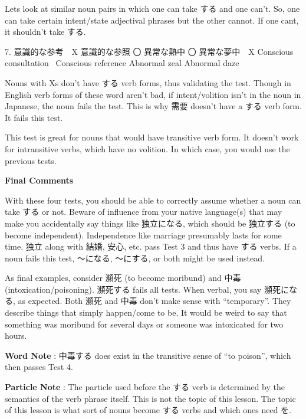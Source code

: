 \par{ Let\textquotesingle s look at similar noun pairs in which one can take する and one can't. So, one can take certain intent\slash state adjectival phrases but the other cannot. If one can\textquotesingle t, it shouldn't take する. }

\par{7. 意識的な参考　X  意識的な参照 〇  異常な熱中 〇  異常な夢中　X \hfill\break
Conscious consultation  Conscious reference  Abnormal zeal  Abnormal daze }

\par{ Nouns with Xs don't have する verb forms, thus validating the test. Though in English verb forms of these word aren't bad, if intent\slash volition isn't in the noun in Japanese, the noun fails the test. This is why 需要 doesn't have a する verb form. It fails this test. }

\par{ This test is great for nouns that would have transitive verb form. It doesn't work for intransitive verbs, which have no volition. In which case, you would use the previous tests. }

\begin{center}
\textbf{Final Comments }
\end{center}

\par{ With these four tests, you should be able to correctly assume whether a noun can take する or not. Beware of influence from your native language(s) that may make you accidentally say things like 独立になる, which should be 独立する (to become independent). Independence like marriage presumably lasts for some time. 独立 along with 結婚, 安心, etc. pass Test 3 and thus have する verbs. If a noun fails this test, ～になる, ～にする, or both might be used instead. }

\par{ As final examples, consider 瀕死 (to become moribund) and 中毒 (intoxication\slash poisoning). 瀕死する fails all tests. When verbal, you say 瀕死になる, as expected. Both 瀕死 and 中毒 don't make sense with “temporary”. They describe things that simply happen\slash come to be. It would be weird to say that something was moribund for several days or someone was intoxicated for two hours. }

\par{\textbf{Word Note }: 中毒する does exist in the transitive sense of “to poison”, which then passes Test 4. }

\par{\textbf{Particle Note }: The particle used before the する verb is determined by the semantics of the verb phrase itself. This is not the topic of this lesson. The topic of this lesson is what sort of nouns become する verbs and which ones need を. }

